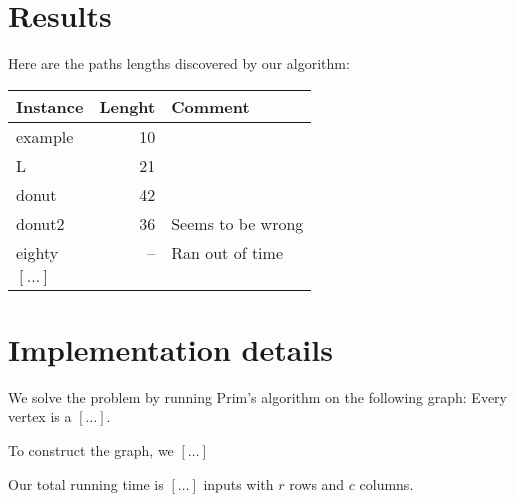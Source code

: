 


	\maketitle
	
	\section{Results}
	
	Here are the paths lengths discovered by our algorithm:
	
	\bigskip
	\begin{tabular}{lrl}\toprule
		Instance & Lenght & Comment  \\\midrule
		example & 10 &  \\
		L & 21 & \\
		donut & 42 \\
		donut2 & 36 & Seems to be wrong\\
		eighty & -- & Ran out of time\\
		$[\ldots]$ \\\bottomrule
	\end{tabular}
	\bigskip
	
	
	\section{Implementation details}
	
	We solve the problem by running Prim's algorithm
	on the following graph:
	Every vertex is a $[\ldots]$.
	
	To construct the graph, we $[\ldots]$
	
	Our total running time is $[\ldots]$ inputs with $r$ rows and $c$ columns.
	

